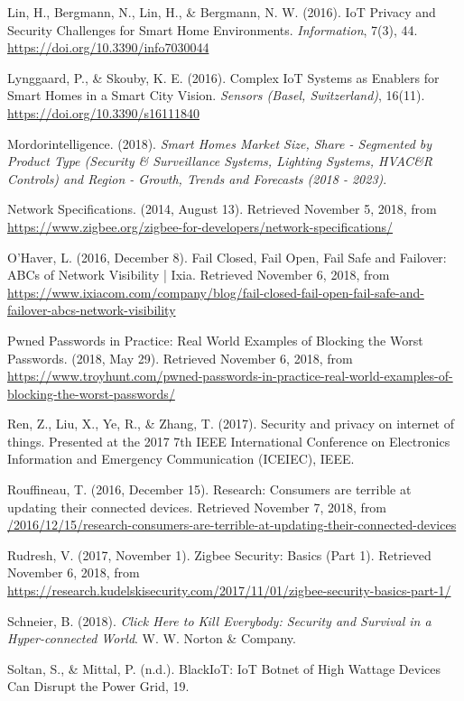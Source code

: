 \begin{hangparas}{2em}{1}
Lin, H., Bergmann, N., Lin, H., \& Bergmann, N. W. (2016). IoT Privacy and Security Challenges for Smart Home Environments. \textit{Information}, 7(3), 44. \url{https://doi.org/10.3390/info7030044}

Lynggaard, P., \& Skouby, K. E. (2016). Complex IoT Systems as Enablers for Smart Homes in a Smart City Vision. \textit{Sensors (Basel, Switzerland)}, 16(11). \url{https://doi.org/10.3390/s16111840}

Mordorintelligence. (2018). \textit{Smart Homes Market Size, Share - Segmented by Product Type (Security \& Surveillance Systems, Lighting Systems, HVAC\&R Controls) and Region - Growth, Trends and Forecasts (2018 - 2023)}.

Network Specifications. (2014, August 13). Retrieved November 5, 2018, from \url{https://www.zigbee.org/zigbee-for-developers/network-specifications/}

O’Haver, L. (2016, December 8). Fail Closed, Fail Open, Fail Safe and Failover: ABCs of Network Visibility | Ixia. Retrieved November 6, 2018, from \url{https://www.ixiacom.com/company/blog/fail-closed-fail-open-fail-safe-and-failover-abcs-network-visibility}

Pwned Passwords in Practice: Real World Examples of Blocking the Worst Passwords. (2018, May 29). Retrieved November 6, 2018, from \url{https://www.troyhunt.com/pwned-passwords-in-practice-real-world-examples-of-blocking-the-worst-passwords/}

Ren, Z., Liu, X., Ye, R., \& Zhang, T. (2017). Security and privacy on internet of things. Presented at the 2017 7th IEEE International Conference on Electronics Information and Emergency Communication (ICEIEC), IEEE.

Rouffineau, T. (2016, December 15). Research: Consumers are terrible at updating their connected devices. Retrieved November 7, 2018, from \url{/2016/12/15/research-consumers-are-terrible-at-updating-their-connected-devices}

Rudresh, V. (2017, November 1). Zigbee Security: Basics (Part 1). Retrieved November 6, 2018, from \url{https://research.kudelskisecurity.com/2017/11/01/zigbee-security-basics-part-1/}

Schneier, B. (2018). \textit{Click Here to Kill Everybody: Security and Survival in a Hyper-connected World}. W. W. Norton \& Company.

Soltan, S., \& Mittal, P. (n.d.). BlackIoT: IoT Botnet of High Wattage Devices Can Disrupt the Power Grid, 19.


\end{hangparas}
